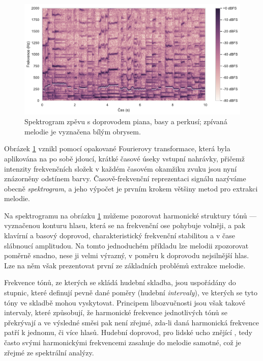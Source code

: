 \begin{figure}[h]\centering
\includegraphics[width=\textwidth,height=\textheight,keepaspectratio]{../img/audio_mix_stft}
\caption{Spektrogram zpěvu s doprovodem piana, basy a perkusí; zpívaná melodie je vyznačena bílým obrysem.}
\label{obr:audio_mix_stft}
\end{figure}


Obrázek \ref{obr:audio_mix_stft} vznikl pomocí opakované Fourierovy transformace, která byla aplikována na po sobě jdoucí, krátké časové úseky vstupní nahrávky, přičemž intenzity frekvenčních složek v každém časovém okamžiku zvuku jsou nyní znázorněny odstínem barvy. Časově-frekvenční reprezentaci signálu nazýváme obecně \emph{spektrogram}, a jeho výpočet je prvním krokem většiny metod pro extrakci melodie.

Na spektrogramu na obrázku \ref{obr:audio_mix_stft} můžeme pozorovat harmonické struktury tónů --- vyznačenou konturu hlasu, která se na frekvenční ose pohybuje volněji, a pak klavírní a basový doprovod, charakteristický frekvenční stabilitou a v čase slábnoucí amplitudou. Na tomto jednoduchém příkladu lze melodii zpozorovat poměrně snadno, nese ji velmi výrazný, v poměru k doprovodu nejsilnější hlas. Lze na něm však prezentovat první ze základních problémů extrakce melodie.

Frekvence tónů, ze kterých se skládá hudební skladba, jsou uspořádány do stupnic, které definují pevně dané poměry (hudební \emph{intervaly}), ve kterých se tyto tóny ve skladbě mohou vyskytovat. Principem libozvučnosti jsou však takové intervaly, které způsobují, že harmonické frekvence jednotlivých tónů se překrývají a ve výsledné směsi pak není zřejmé, zda-li daná harmonická frekvence patří k jednomu, či více hlasů. Hudební doprovod, pro lidské ucho znějící , tedy často svými harmonickými frekvencemi zasahuje do melodie samotné, což je zřejmé ze spektrální analýzy.


